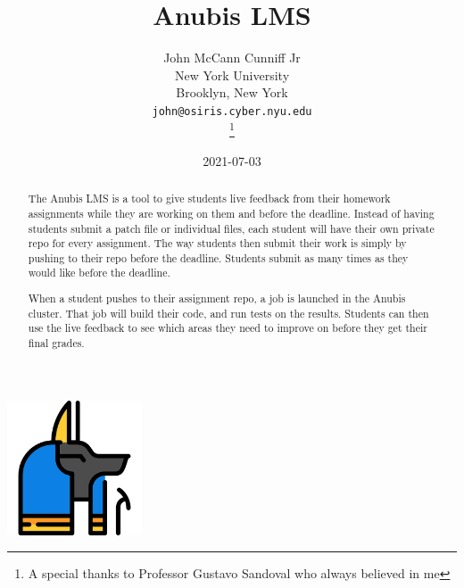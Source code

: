 \documentclass[12pt letterpaper]{report}
\title{Anubis LMS}
\date{2021-07-03}
\author{%
    John McCann Cunniff Jr \\
    New York University\\
    Brooklyn, New York \\
    \texttt{john@osiris.cyber.nyu.edu} \\
    \thanks{A special thanks to Professor Gustavo Sandoval who always believed in me} \\
}
\begin{document}
    \begin{titlepage}

        \maketitle

        \vspace{0.3cm}
        \begin{center}
            \includegraphics[width=0.3\textwidth]{figures/anubis-icon-1.png}
        \end{center}
        \vspace{0.3cm}

        \begin{abstract}
            The Anubis LMS is a tool to give students live feedback from their homework
            assignments while they are working on them and before the deadline.
            Instead of having students submit a patch file or individual files, each student
            will have their own private repo for every assignment.
            The way students then submit their work is simply by pushing to their repo before
            the deadline.
            Students submit as many times as they would like before the deadline.

            When a student pushes to their assignment repo, a job is launched in the Anubis cluster.
            That job will build their code, and run tests on the results.
            Students can then use the live feedback to see which areas they need to improve on
            before they get their final grades.
        \end{abstract}


    \end{titlepage}
\end{document}
